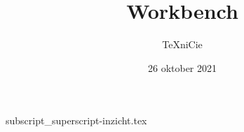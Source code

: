 \documentclass{cursuspresentatie}
\title{Workbench}
\author{\TeX niCie}
\date{26 oktober 2021}
\def\importslide#1#2{%
    {#2}
}
\begin{document}
    \importslide{math}{subscript_superscript-inzicht.tex}
    
\end{document}

